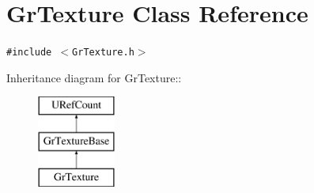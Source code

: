 \hypertarget{class_gr_texture}{
\section{GrTexture Class Reference}
\label{class_gr_texture}
}
{\tt \#include $<$GrTexture.h$>$}

Inheritance diagram for GrTexture::\begin{figure}[H]
\begin{center}
\leavevmode
\includegraphics[height=3cm]{class_gr_texture}
\end{center}
\end{figure}
